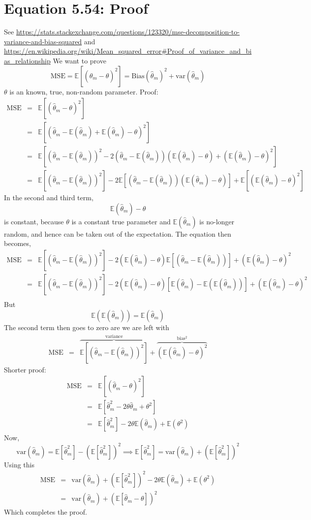 \documentclass{article}
\newcommand{\beq}{\begin{equation}}
\newcommand{\eeq}{\end{equation}}
\newcommand{\ber}{\begin{eqnarray}}
\newcommand{\eer}{\end{eqnarray}}
\begin{document}
\section{Equation 5.54: Proof}
See \url{https://stats.stackexchange.com/questions/123320/mse-decomposition-to-variance-and-bias-squared} and \url{https://en.wikipedia.org/wiki/Mean_squared_error#Proof_of_variance_and_bias_relationship}
We want to prove
\beq
\text{MSE} = \mathbb{E}[(\hat{\theta}_m - \theta)^2] = \text{Bias}(\hat{\theta}_{m})^2 + \text{var}(\hat{\theta}_{m})
\eeq
$\theta$ is an known, true, non-random parameter. Proof:
\ber
\text{MSE} &=& \mathbb{E}[(\hat{\theta}_m-\theta)^2] \\
&=& \mathbb{E}[(\hat{\theta}_m-\mathbb{E}(\hat{\theta}_m)+\mathbb{E}(\hat{\theta}_m)-\theta)^2]\\
&=& \mathbb{E}[(\hat{\theta}_m-\mathbb{E}(\hat{\theta}_m))^2 - 2(\hat{\theta}_m-\mathbb{E}(\hat{\theta}_m))(\mathbb{E}(\hat{\theta}_m)-\theta) +  (\mathbb{E}(\hat{\theta}_m)-\theta)^2]\\
&=&  \mathbb{E}[(\hat{\theta}_m-\mathbb{E}(\hat{\theta}_m))^2] - 2\mathbb{E}[(\hat{\theta}_m-\mathbb{E}(\hat{\theta}_m))(\mathbb{E}(\hat{\theta}_m)-\theta)] + \mathbb{E}[(\mathbb{E}(\hat{\theta}_m)-\theta)^2]
\eer
In the second and third term,
\beq
\mathbb{E}(\hat{\theta}_m)-\theta
\eeq
is constant, because $\theta$ is a constant true parameter and $\mathbb{E}(\hat{\theta}_m)$ is no-longer random, and hence can be taken out of the expectation. The equation then becomes,
\ber
\text{MSE} &=& \mathbb{E}[(\hat{\theta}_m-\mathbb{E}(\hat{\theta}_m))^2] - 2(\mathbb{E}(\hat{\theta}_m)-\theta)\mathbb{E}[(\hat{\theta}_m-\mathbb{E}(\hat{\theta}_m))] + (\mathbb{E}(\hat{\theta}_m)-\theta)^2 \\
&=& \mathbb{E}[(\hat{\theta}_m-\mathbb{E}(\hat{\theta}_m))^2] - 2(\mathbb{E}(\hat{\theta}_m)-\theta)[\mathbb{E}(\hat{\theta}_m)-\mathbb{E}(\mathbb{E}(\hat{\theta}_m))] + (\mathbb{E}(\hat{\theta}_m)-\theta)^2 \\
\eer
But
\beq
\mathbb{E}(\mathbb{E}(\hat{\theta}_m)) = \mathbb{E}(\hat{\theta}_m)
\eeq
The second term then goes to zero are we are left with
\ber
\text{MSE} &=& \overbrace{\mathbb{E}[(\hat{\theta}_m-\mathbb{E}(\hat{\theta}_m))^2]}^\text{variance} + \overbrace{(\mathbb{E}(\hat{\theta}_m)-\theta)^2}^\text{bias$^2$}
\eer
Shorter proof:
\ber
\text{MSE} &=& \mathbb{E}[(\hat{\theta}_m-\theta)^2] \\
&=& \mathbb{E}[\hat{\theta}^2_m - 2\theta\hat{\theta}_m + \theta^2] \\
&=& \mathbb{E}[\hat{\theta}^2_m] -2\theta\mathbb{E}(\hat{\theta}_m) + \mathbb{E}(\theta^2)
\eer
Now,
\beq
\text{var}(\hat{\theta}_m) = \mathbb{E}[\hat{\theta}^2_m] - (\mathbb{E}[\hat{\theta}^2_m])^2
\implies
\mathbb{E}[\hat{\theta}^2_m] = \text{var}(\hat{\theta}_m) + (\mathbb{E}[\hat{\theta}^2_m])^2
\eeq
Using this
\ber
\text{MSE} &=& \text{var}(\hat{\theta}_m) + (\mathbb{E}[\hat{\theta}^2_m])^2 -2\theta\mathbb{E}(\hat{\theta}_m) + \mathbb{E}(\theta^2) \\
&=& \text{var}(\hat{\theta}_m) + (\mathbb{E}[\hat{\theta}_m-\theta])^2
\eer
Which completes the proof.
\end{document}
